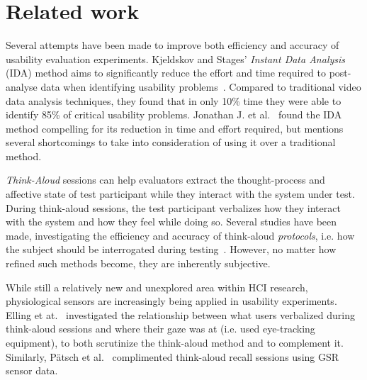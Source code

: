 
\section{Related work}
Several attempts have been made to improve both efficiency and accuracy of
usability evaluation experiments. Kjeldskov and Stages' \textit{Instant Data
Analysis} (IDA) method aims to significantly reduce the effort and time required
to post-analyse data when identifying usability
problems~\cite{instant_data_analysis}. Compared to traditional video data
analysis techniques, they found that in only 10\% time they were able to
identify 85\% of critical usability problems. Jonathan J. et
al.~\cite{use_of_TA_and_IDA} found the IDA
method compelling for its reduction in time and effort required, but mentions
several shortcomings to take into consideration of using it over a traditional
method.

\textit{Think-Aloud} sessions can help evaluators extract the thought-process
and affective state of test participant while they interact with the system
under test. During think-aloud sessions, the test participant verbalizes how
they interact with the system and how they feel while doing so.  Several studies
have been made, investigating the efficiency and accuracy of think-aloud
\textit{protocols}, i.e. how the subject should be interrogated during
testing~\cite{two_think_aloud_protocols_study}. However, no matter how refined
such methods become, they are inherently subjective.

While still a relatively new and unexplored area within HCI research,
physiological sensors are increasingly being applied in usability experiments.
Elling et at.~\cite{concurrent_think_aloud_eye_tracking} investigated the
relationship between what users verbalized during think-aloud sessions and where
their gaze was at (i.e. used eye-tracking equipment), to both scrutinize the
think-aloud method and to complement it. Similarly, P\"{a}tsch et
al.~\cite{using_sensor_graphs_think_aloud} complimented think-aloud recall
sessions using GSR sensor data.

